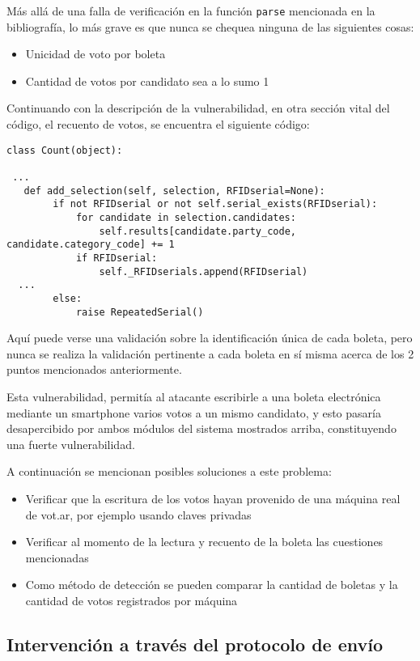 Más allá de una falla de verificación en la función \texttt{parse} mencionada en la bibliografía, lo más grave es que nunca se chequea ninguna de las siguientes cosas:
\begin{itemize}
	\item Unicidad de voto por boleta
	\item Cantidad de votos por candidato sea a lo sumo 1
\end{itemize}

Continuando con la descripción de la vulnerabilidad, en otra sección vital del código, el recuento de votos, se encuentra el siguiente código:

\begin{lstlisting}
class Count(object):

 ...
   def add_selection(self, selection, RFIDserial=None):
        if not RFIDserial or not self.serial_exists(RFIDserial):
            for candidate in selection.candidates:
                self.results[candidate.party_code, candidate.category_code] += 1
            if RFIDserial:
                self._RFIDserials.append(RFIDserial)
  ...
        else:
            raise RepeatedSerial()
\end{lstlisting}

Aquí puede verse una validación sobre la identificación única de cada boleta, pero nunca se realiza la validación pertinente a cada boleta en sí misma acerca de los 2 puntos mencionados anteriormente.

Esta vulnerabilidad, permitía al atacante escribirle a una boleta electrónica mediante un smartphone varios votos a un mismo candidato, y esto pasaría desapercibido por ambos módulos del sistema mostrados arriba, constituyendo una fuerte vulnerabilidad.

A continuación se mencionan posibles soluciones a este problema:

\begin{itemize}
	\item Verificar que la escritura de los votos hayan provenido de una máquina real de vot.ar, por ejemplo usando claves privadas
	\item Verificar al momento de la lectura y recuento de la boleta las cuestiones mencionadas
	\item Como método de detección se pueden comparar la cantidad de boletas y la cantidad de votos registrados por máquina
\end{itemize}


\subsection{Intervención a través del protocolo de envío}

